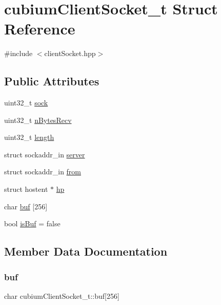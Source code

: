 \hypertarget{structcubiumClientSocket__t}{}\section{cubium\+Client\+Socket\+\_\+t Struct Reference}
\label{structcubiumClientSocket__t}


{\ttfamily \#include $<$client\+Socket.\+hpp$>$}

\subsection*{Public Attributes}
\begin{DoxyCompactItemize}
\item 
uint32\+\_\+t \hyperlink{structcubiumClientSocket__t_abaa0344892988ffb56dea7f82b88cbc3}{sock}
\item 
uint32\+\_\+t \hyperlink{structcubiumClientSocket__t_af0fb9d2f6a29407f9efb5cbc9da1f314}{n\+Bytes\+Recv}
\item 
uint32\+\_\+t \hyperlink{structcubiumClientSocket__t_a1328962fd1aceb332accc664f006f35c}{length}
\item 
struct sockaddr\+\_\+in \hyperlink{structcubiumClientSocket__t_ad89460d48cb94e5cda49ed0481e927f1}{server}
\item 
struct sockaddr\+\_\+in \hyperlink{structcubiumClientSocket__t_adbcedcdc98e808414c6b08b41d3a3450}{from}
\item 
struct hostent $\ast$ \hyperlink{structcubiumClientSocket__t_a976b1153569e15360062775633f759fa}{hp}
\item 
char \hyperlink{structcubiumClientSocket__t_af4af5909ff1caa85848438449d1edc91}{buf} \mbox{[}256\mbox{]}
\item 
bool \hyperlink{structcubiumClientSocket__t_aa796f9502f1416372e62080b9e1a7446}{is\+Buf} = false
\end{DoxyCompactItemize}


\subsection{Member Data Documentation}
\mbox{\label{structcubiumClientSocket__t_af4af5909ff1caa85848438449d1edc91}} 
\subsubsection{\texorpdfstring{buf}{buf}}
{\footnotesize\ttfamily char cubium\+Client\+Socket\+\_\+t\+::buf\mbox{[}256\mbox{]}}

